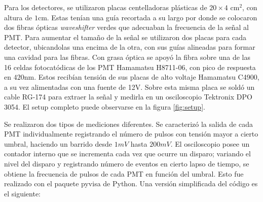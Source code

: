 \documentclass[12pt,a4paper]{article}
\numberwithin{equation}{section}
\begin{document}
Para los detectores, se utilizaron placas centelladoras plásticas de $20\times4\text{ cm}^2$, con altura de $1$cm. Estas tenían una guía recortada a su largo por donde se colocaron dos fibras ópticas \textit{waveshifter} verdes que adecuaban la frecuencia de la señal al PMT. Para aumentar el tamaño de la señal se utilizaron dos placas para cada detector, ubicandolas una encima de la otra, con sus guías alineadas para formar una cavidad para las fibras. Con grasa óptica se apoyó la fibra sobre una de las 16 celdas fotocatódicas de los PMT Hamamatsu H8711-06, con pico de respuesta en $420$nm\cite{cacamatsu}. Estos recibían tensión de sus placas de alto voltaje Hamamatsu C4900, a su vez alimentadas con una fuente de 12V. Sobre esta misma placa se soldó un cable RG-174 para extraer la señal y medirla en un osciloscopio Tektronix DPO 3054. El setup completo puede observarse en la figura \ref{fig:setup}.



Se realizaron dos tipos de mediciones diferentes. Se caracterizó la salida de cada PMT individualmente registrando el número de pulsos con tensión mayor a cierto umbral, haciendo un barrido desde $1mV$ hasta $200mV$. El osciloscopio posee un contador interno que se incrementa cada vez que ocurre un disparo; variando el nivel del disparo y registrando número de eventos en cierto lapso de tiempo, se obtiene la frecuencia de pulsos de cada PMT en función del umbral. Esto fue realizado con el paquete pyvisa de Python. Una versión simplificada del código es el siguiente:
\end{document}
